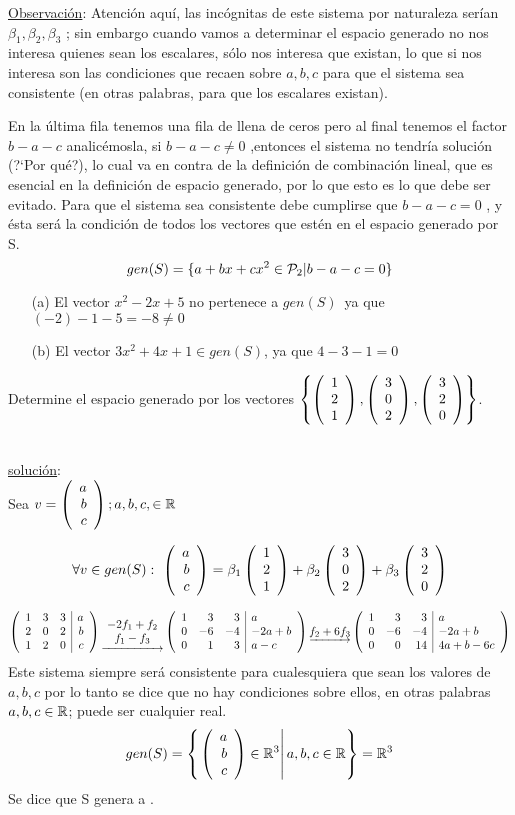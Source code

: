 \underline{Observación}: Atención aquí, las incógnitas de este sistema por naturaleza serían $\beta_1, \beta_2, \beta_3$
; sin embargo cuando vamos a determinar el espacio generado no nos interesa quienes sean los escalares, sólo nos interesa que existan, lo que si nos interesa son las condiciones que recaen sobre $a,b,c$
para que el sistema sea consistente (en otras palabras, para que los escalares existan).


En la última fila tenemos una fila de llena de ceros pero al final tenemos el factor $b-a-c$
analicémosla, si $b-a-c\neq 0$
,entonces el sistema no tendría solución (?`Por qué?), lo cual va
en contra de la definición de combinación lineal, que es esencial en la definición de espacio
generado, por lo que esto es lo que debe ser evitado. Para que el sistema sea consistente debe cumplirse que $b-a-c=0$
, y ésta será la condición de todos los vectores que estén en el
espacio generado por S.
\[gen(S)=
\lbrace
a+b x+c x^2 \in \pdos|
b-a-c=0
\rbrace
\]
\begin{enumerate}

\item[(a)] El vector $x^2-2x+5$ no pertenece a $gen(S)$\ ya que $(-2)-1-5=-8\neq 0$
\item[(b)] El vector $3x^2+4x+1 \in gen(S)$, ya que $4-3-1=0$
\end{enumerate}

\begin{ejemplo}
Determine el espacio generado por los vectores $\left\{ \vectrtres{1}{2}{1}, \vectrtres{3}{0}{2}, \vectrtres{3}{2}{0}\right\}$.
\end{ejemplo}

~\\
\underline{solución}:
~\\

Sea $v=\vectrtres{a}{b}{c}; a, b, c, \in \dobler$

\[
\forall v\in gen(S):\ 
\vectrtres{a}{b}{c}=
\beta_1\vectrtres{1}{2}{1}+
\beta_2\vectrtres{3}{0}{2}+
\beta_3\vectrtres{3}{2}{0}
\]

\[
\reducir{rrr|r}{
1&3&3&a\\
2&0&2&b\\
1&2&0&c
}
\underrightarrow{\begin{array}{cc}
    -2f_1 + f_2\\
    f_1 - f_3
\end{array}}
\reducir{rrr|l}{
1&3&3&a\\
0&-6&-4&-2a+b\\
0&1&3&a-c
}
\underrightarrow{f_2 + 6f_3}
\reducir{rrr|l}{
1&3&3&a\\
0&-6&-4&-2a+b\\
0&0&14&4a+b-6c
}
\]
Este sistema siempre ser\'a consistente para cualesquiera que sean los valores de $a, b, c$ por lo
tanto se dice que no hay condiciones sobre ellos, en otras palabras $a, b, c \in \dobler$; puede ser
cualquier real.
\[
gen(S)=
\left\{
\left.
\vectrtres{a}{b}{c} \in \rtres \right|
a, b, c \in \dobler
\right\}=\rtres
\]
Se dice que S genera a \rtres.

